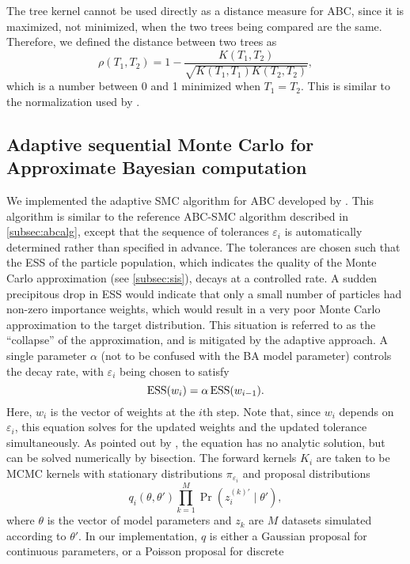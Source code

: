 The tree kernel cannot be used directly as a distance measure for \gls{ABC},
since it is maximized, not minimized, when the two trees being compared are the
same. Therefore, we defined the distance between two trees as
\[
  \rho(T_1, T_2) = 1 - \frac{K(T_1, T_2)}{\sqrt{K(T_1, T_1) K(T_2, T_2)}},
\]
which is a number between 0 and 1 minimized when $T_1 = T_2$. This is similar
to the normalization used by \textcite{collins2002new, poon2013mapping}.

\subsection{Adaptive sequential Monte Carlo for Approximate Bayesian computation}
\label{subsec:adaptsmc}

We implemented the adaptive \gls{SMC} algorithm for \gls{ABC} developed by
\textcite{del2012adaptive}. This algorithm is similar to the reference
\gls{ABC}-\gls{SMC} algorithm described in \cref{subsec:abcalg}, except that
the sequence of tolerances $\varepsilon_i$ is automatically determined rather
than specified in advance. The tolerances are chosen such that the \gls{ESS} of
the particle population, which indicates the quality of the Monte Carlo
approximation (see \cref{subsec:sis}), decays at a controlled rate. A
sudden precipitous drop in \gls{ESS} would indicate that only a small number of
particles had non-zero importance weights, which would result in a very poor
Monte Carlo approximation to the target distribution. This situation is
referred to as the ``collapse'' of the approximation, and is mitigated by the
adaptive approach. A single parameter $\alpha$ (not to be confused with the
\gls{BA} model parameter) controls the decay rate, with $\varepsilon_i$ being
chosen to satisfy
\[
  \operatorname{ESS}(w_i) = \alpha \operatorname{ESS}(w_{i-1}).
\]
Here, $w_i$ is the vector of weights at the $i$th step. Note that, since $w_i$
depends on $\varepsilon_i$, this equation solves for the updated weights and
the updated tolerance simultaneously. As pointed out by
\textcite{del2012adaptive}, the equation has no analytic solution, but can be
solved numerically by bisection. The forward kernels $K_i$ are taken to be
\gls{MCMC} kernels with stationary distributions $\pi_{\varepsilon_i}$ and
proposal distributions
\[
  q_i(\theta, \theta') \prod_{k=1}^M \Pr(z_i^{(k)'} \mid \theta'),
\]
where $\theta$ is the vector of model parameters and $z_k$ are $M$ datasets
simulated according to $\theta'$. In our implementation, $q$ is either a
Gaussian proposal for continuous parameters, or a Poisson proposal for discrete
